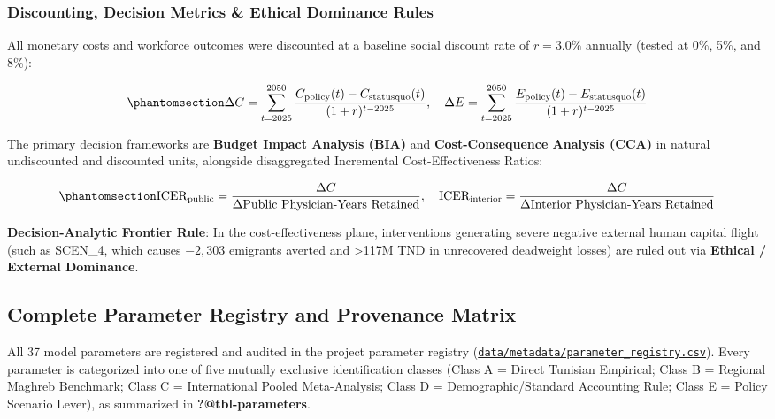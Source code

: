 \documentclass[
  11pt,
  a4paper]{article}
\begin{document}
\subsubsection{Discounting, Decision Metrics \& Ethical Dominance
Rules}\label{discounting-decision-metrics-ethical-dominance-rules}

All monetary costs and workforce outcomes were discounted at a baseline
social discount rate of \(r = 3.0\%\) annually (tested at 0\%, 5\%, and
8\%):

\begin{equation}\protect\phantomsection\label{eq-discounting}{\Delta C = \sum_{t=2025}^{2050} \frac{C_{\text{policy}}(t) - C_{\text{statusquo}}(t)}{(1 + r)^{t - 2025}}, \quad \Delta E = \sum_{t=2025}^{2050} \frac{E_{\text{policy}}(t) - E_{\text{statusquo}}(t)}{(1 + r)^{t - 2025}}}\end{equation}

The primary decision frameworks are \textbf{Budget Impact Analysis
(BIA)} and \textbf{Cost-Consequence Analysis (CCA)} in natural
undiscounted and discounted units, alongside disaggregated Incremental
Cost-Effectiveness Ratios:

\begin{equation}\protect\phantomsection\label{eq-icer}{\text{ICER}_{\text{public}} = \frac{\Delta C}{\Delta \text{Public Physician-Years Retained}}, \quad \text{ICER}_{\text{interior}} = \frac{\Delta C}{\Delta \text{Interior Physician-Years Retained}}}\end{equation}

\textbf{Decision-Analytic Frontier Rule}: In the cost-effectiveness
plane, interventions generating severe negative external human capital
flight (such as SCEN\_4, which causes \(-2,303\) emigrants averted and
\textgreater117M TND in unrecovered deadweight losses) are ruled out via
\textbf{Ethical / External Dominance}.

\subsection{Complete Parameter Registry and Provenance
Matrix}\label{sec-methods-param-table}

All 37 model parameters are registered and audited in the project
parameter registry
(\href{file:///c:/Users/drfir/Documents/physician-exodus-tunisia/data/metadata/parameter_registry.csv}{\texttt{data/metadata/parameter\_registry.csv}}).
Every parameter is categorized into one of five mutually exclusive
identification classes (Class A = Direct Tunisian Empirical; Class B =
Regional Maghreb Benchmark; Class C = International Pooled
Meta-Analysis; Class D = Demographic/Standard Accounting Rule; Class E =
Policy Scenario Lever), as summarized in \textbf{?@tbl-parameters}.
\end{document}
